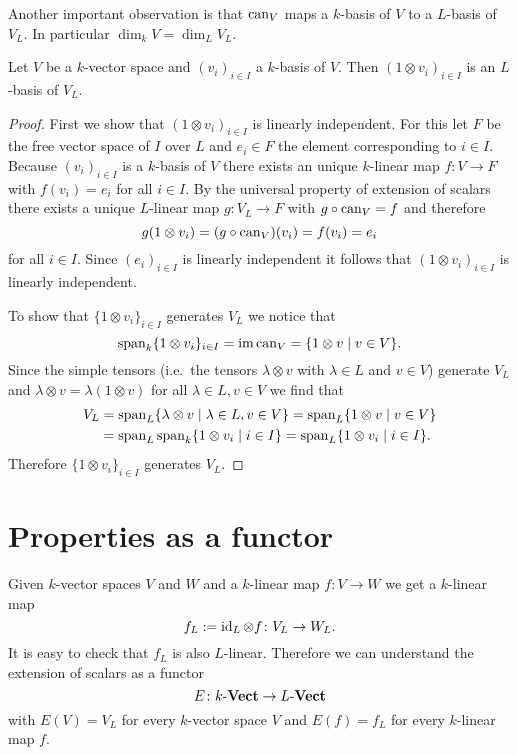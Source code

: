 Another important observation is that $\operatorname{can}_V$ maps a $k$-basis of $V$ to a $L$-basis of $V_L$. In particular $\dim_k V = \dim_L V_L$.


\begin{lem}
 Let $V$ be a $k$-vector space and $(v_i)_{i \in I}$ a $k$-basis of $V$. Then $(1 \otimes v_i)_{i \in I}$ is an $L$-basis of $V_L$.
\end{lem}
\begin{proof}
 First we show that $(1 \otimes v_i)_{i \in I}$ is linearly independent. For this let $F$ be the free vector space of $I$ over $L$ and $e_i \in F$ the element corresponding to $i \in I$. Because $(v_i)_{i \in I}$ is a $k$-basis of $V$ there exists an unique $k$-linear map $f \colon V \to F$ with $f(v_i) = e_i$ for all $i \in I$. By the universal property of extension of scalars there exists a unique $L$-linear map $g \colon V_L \to F$ with $g \circ \operatorname{can}_V = f$ and therefore
 \[
  g(1 \otimes v_i) = (g \circ \operatorname{can}_V)(v_i) = f(v_i) = e_i
 \]
 for all $i \in I$. Since $(e_i)_{i \in I}$ is linearly independent it follows that $(1 \otimes v_i)_{i \in I}$ is linearly independent.
 
 To show that $\{1 \otimes v_i\}_{i \in I}$ generates $V_L$ we notice that
 \[
  \operatorname{span}_k \{1 \otimes v_i\}_{i \in I}
  = \operatorname{im} \operatorname{can}_V
  = \{1 \otimes v \mid v \in V\}.
 \]
 Since the simple tensors (i.e.\ the tensors $\lambda \otimes v$ with $\lambda \in L$ and $v \in V$) generate $V_L$ and $\lambda \otimes v = \lambda(1 \otimes v)$ for all $\lambda \in L, v \in V$ we find that
 \begin{align*}
  V_L
  &= \operatorname{span}_L \{\lambda \otimes v \mid \lambda \in L, v \in V\}
  = \operatorname{span}_L \{1 \otimes v \mid v \in V\} \\
  &= \operatorname{span}_L \operatorname{span}_k \{1 \otimes v_i \mid i \in I\}
  = \operatorname{span}_L \{1 \otimes v_i \mid i \in I\}.
 \end{align*}
 Therefore $\{1 \otimes v_i\}_{i \in I}$ generates $V_L$.
\end{proof}





\section{Properties as a functor}


Given $k$-vector spaces $V$ and $W$ and a $k$-linear map $f \colon V \to W$ we get a $k$-linear map
\[
 f_L := \operatorname{id}_L \otimes f \colon V_L \to W_L.
\]
It is easy to check that $f_L$ is also $L$-linear. Therefore we can understand the extension of scalars as a functor
\[
 E \colon k\text{-}\mathbf{Vect} \to L\text{-}\mathbf{Vect}
\]
with $E(V) = V_L$ for every $k$-vector space $V$ and $E(f) = f_L$ for every $k$-linear map $f$.

